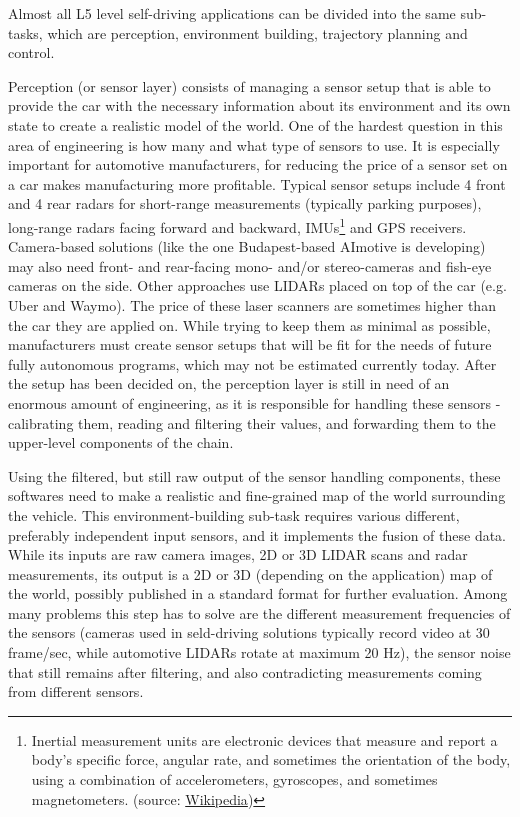 Almost all L5 level self-driving applications can be divided into the same sub-tasks, which are perception, environment building, trajectory planning and control.

Perception (or sensor layer) consists of managing a sensor setup that is able to provide the car with the necessary information about its environment and its own state to create a realistic model of the world. One of the hardest question in this area of engineering is how many and what type of sensors to use. It is especially important for automotive manufacturers, for reducing the price of a sensor set on a car makes manufacturing more profitable. Typical sensor setups include 4 front and 4 rear radars for short-range measurements (typically parking purposes), long-range radars facing forward and backward, IMUs\footnote{Inertial measurement units are electronic devices that measure and report a body's specific force, angular rate, and sometimes the orientation of the body, using a combination of accelerometers, gyroscopes, and sometimes magnetometers. (source: \href{https://en.wikipedia.org/wiki/Inertial_measurement_unit}{Wikipedia})} and GPS receivers. Camera-based solutions (like the one Budapest-based AImotive is developing) may also need front- and rear-facing mono- and/or stereo-cameras and fish-eye cameras on the side. Other approaches use LIDARs placed on top of the car (e.g. Uber and Waymo). The price of these laser scanners are sometimes higher than the car they are applied on. While trying to keep them as minimal as possible, manufacturers must create sensor setups that will be fit for the needs of future fully autonomous programs, which may not be estimated currently today. After the setup has been decided on, the perception layer is still in need of an enormous amount of engineering, as it is responsible for handling these sensors - calibrating them, reading and filtering their values, and forwarding them to the upper-level components of the chain.

Using the filtered, but still raw output of the sensor handling components, these softwares need to make a realistic and fine-grained map of the world surrounding the vehicle. This environment-building sub-task requires various different, preferably independent input sensors, and it implements the fusion of these data. While its inputs are raw camera images, 2D or 3D LIDAR scans and radar measurements, its output is a 2D or 3D (depending on the application) map of the world, possibly published in a standard format for further evaluation. Among many problems this step has to solve are the different measurement frequencies of the sensors (cameras used in seld-driving solutions typically record video at 30 frame/sec, while automotive LIDARs rotate at maximum 20 Hz), the sensor noise that still remains after filtering, and also contradicting measurements coming from different sensors.

